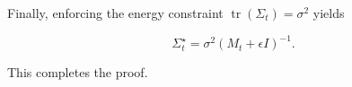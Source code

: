 \documentclass{article}
\begin{document}
Finally, enforcing the energy constraint $\operatorname{tr}(\Sigma_t)=\sigma^2$ yields

\begin{equation}
\Sigma_t^\star
=
\sigma^2
(M_t + \epsilon I)^{-1}.
\end{equation}

This completes the proof.




\end{document}
